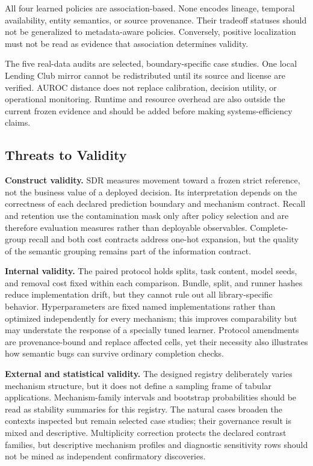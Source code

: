\documentclass[sigconf,review]{acmart}
\begin{document}
All four learned policies are association-based. None encodes lineage,
temporal availability, entity semantics, or source provenance. Their tradeoff
statuses should not be generalized to metadata-aware policies. Conversely,
positive localization must not be read as evidence that association determines
validity.

The five real-data audits are selected, boundary-specific case studies. One
local Lending Club mirror cannot be redistributed until its source and license
are verified. AUROC distance does not replace calibration, decision utility,
or operational monitoring. Runtime and resource overhead are also outside the
current frozen evidence and should be added before making systems-efficiency
claims.

\subsection{Threats to Validity}

\textbf{Construct validity.} SDR measures movement toward a frozen strict
reference, not the business value of a deployed decision. Its interpretation
depends on the correctness of each declared prediction boundary and mechanism
contract. Recall and retention use the contamination mask only after policy
selection and are therefore evaluation measures rather than deployable
observables. Complete-group recall and both cost contracts address one-hot
expansion, but the quality of the semantic grouping remains part of the
information contract.

\textbf{Internal validity.} The paired protocol holds splits, task content,
model seeds, and removal cost fixed within each comparison. Bundle, split, and
runner hashes reduce implementation drift, but they cannot rule out all
library-specific behavior. Hyperparameters are fixed named
implementations rather than optimized independently for every mechanism; this
improves comparability but may understate the response of a specially tuned
learner. Protocol amendments are provenance-bound and replace affected cells,
yet their necessity also illustrates how semantic bugs can survive ordinary
completion checks.

\textbf{External and statistical validity.} The designed registry deliberately
varies mechanism structure, but it does not define a sampling frame of tabular
applications. Mechanism-family intervals and bootstrap probabilities should be
read as stability summaries for this registry. The natural cases broaden the
contexts inspected but remain selected case studies; their governance result is
mixed and descriptive. Multiplicity correction protects the declared contrast
families, but descriptive mechanism profiles and diagnostic sensitivity rows
should not be mined as independent confirmatory discoveries.
\end{document}
